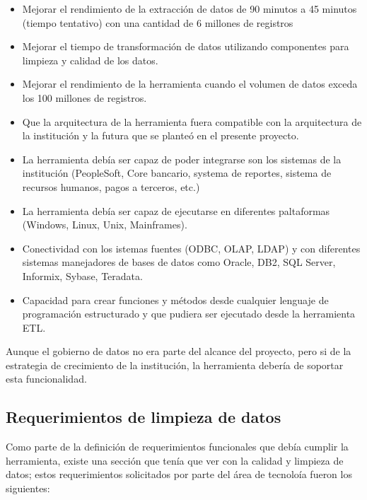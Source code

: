 \begin{itemize}

\item Mejorar el rendimiento de la extracción de datos de 90 minutos a 45
  minutos (tiempo tentativo) con una cantidad de 6 millones de registros

\item Mejorar el tiempo de transformación de datos utilizando componentes para
  limpieza y calidad de los datos.

\item Mejorar el rendimiento de la herramienta cuando el volumen de datos exceda
  los 100 millones de registros.

\item Que la arquitectura de la herramienta fuera compatible con la arquitectura
  de la institución y la futura que se planteó en el presente proyecto.

\item La herramienta debía ser capaz de poder integrarse son los sistemas de la
  institución (PeopleSoft, Core bancario, systema de reportes, sistema de
  recursos humanos, pagos a terceros, etc.)

\item La herramienta debía ser capaz de ejecutarse en diferentes paltaformas
  (Windows, Linux, Unix, Mainframes).

\item Conectividad con los istemas fuentes (ODBC, OLAP, LDAP) y con diferentes
  sistemas manejadores de bases de datos como Oracle, DB2, SQL Server, Informix,
  Sybase, Teradata.

\item Capacidad para crear funciones y métodos desde cualquier lenguaje de
  programación estructurado y que pudiera ser ejecutado desde la herramienta
  ETL.
\end{itemize}

Aunque el gobierno de datos no era parte del alcance del proyecto, pero si de la
estrategia de crecimiento de la institución, la herramienta debería de soportar
esta funcionalidad.

\subsection{Requerimientos de limpieza de datos}

Como parte de la definición de requerimientos funcionales que debía cumplir la
herramienta, existe una sección que tenía que ver con la calidad y limpieza de
datos; estos requerimientos solicitados por parte del área de tecnoloía fueron
los siguientes:

